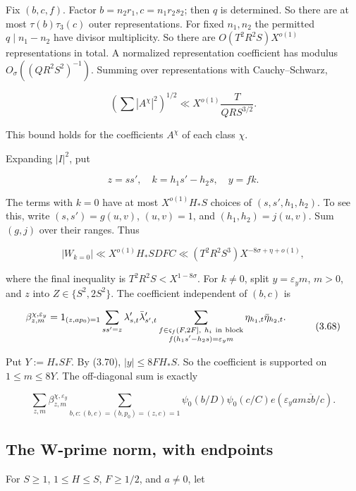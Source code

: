 Fix $(b,c,f)$. Factor $b=n_2r_1,c=n_1r_2s_2$; then $q$ is determined.
So there are at most $\tau(b)\tau_3(c)$ outer representations.
For fixed $n_1,n_2$ the permitted $q\mid n_1-n_2$ have divisor multiplicity.
So there are $O(T^2R^2S)X^{o(1)}$ representations in total.
A normalized representation coefficient
has modulus $O_\sigma((QR^2S^2)^{-1})$. Summing over representations with Cauchy--Schwarz,

\[
\left(\sum|A^\chi|^2\right)^{1/2}
 \ll X^{o(1)}\frac{T}{QRS^{3/2}}.
\tag{3.65}
\]

This bound holds for the coefficients $A^\chi$ of each class $\chi$.

Expanding $|I|^2$, put

\[
z=ss',\quad k=h_1s'-h_2s,\quad y=fk.
\tag{3.66}
\]

The terms with $k=0$ have at most $X^{o(1)}H_*S$ choices of
$(s,s',h_1,h_2)$. To see this, write $(s,s')=g(u,v)$, $(u,v)=1$, and
$(h_1,h_2)=j(u,v)$. Sum $(g,j)$ over their ranges. Thus

\[
|W_{k=0}|\ll X^{o(1)}H_*S DFC
 \ll (T^2R^2S^3)X^{-8\sigma+\eta+o(1)},
\tag{3.67}
\]

\noindent where the final inequality is $T^2R^2S<X^{1-8\sigma}$.
For $k\ne0$, split $y=\varepsilon_y m$, $m>0$, and $z$ into
$Z\in\{S^2,2S^2\}$. The coefficient independent of $(b,c)$ is

\[
\begin{aligned}
\beta^{\chi,\varepsilon_y}_{z,m}={}&1_{(z,ap_0)=1}
 \sum_{ss'=z}\lambda'_{s,t}\bar\lambda'_{s',t}
 \sum_{\substack{f\in\varsigma_f(F,2F],\ h_i\ {\rm in\ block}\\
                  f(h_1s'-h_2s)=\varepsilon_y m}}
                     \eta_{h_1,t}\bar\eta_{h_2,t}.
\end{aligned}
\tag{3.68}
\]

Put $Y:=H_*SF$. By (3.70), $|y|\le8FH_*S$.
So the coefficient is supported on $1\le m\le8Y$.
The off-diagonal sum is exactly

\[
\sum_{z,m}\beta_{z,m}^{\chi,\varepsilon_y}
 \sum_{b,c:(b,c)=(b,p_0)=(z,c)=1}
      \psi_0(b/D)\psi_0(c/C)e(\varepsilon_y a m\overline{zb}/c).
\tag{3.69}
\]

\subsection{The W-prime norm, with endpoints}

For $S\ge1$, $1\le H\le S$, $F\ge1/2$, and $a\ne0$, let

